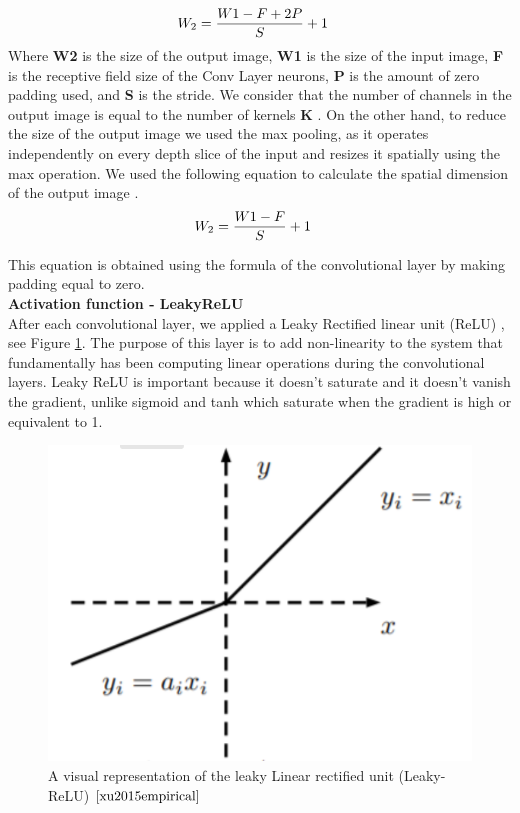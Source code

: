 \documentclass{vldb}
\begin{document}
\begin{align}
   & \large W_{2}=\frac{W1-F+2P}{S} +1 
\end{align}
Where \textbf{W2} is the size of the output image, \textbf{W1} is the size of the input image, \textbf{F} is the receptive field size of the Conv Layer neurons, \textbf{P} is the amount of zero padding used, and \textbf{S} is the stride. We consider that the number of channels in the output image is equal to the number of kernels \textbf{K} \cite{karpathy}.
On the other hand, to reduce the size of the output image we used the max pooling, as it operates independently on every depth slice of the input and resizes it spatially using the max operation. We used the following equation to calculate the spatial dimension of the output image \cite{schmidhuber2015deep}. 
\begin{align}
   & \large W_{2}=\frac{W1-F}{S} +1
\end{align}

This equation is obtained using the formula of the convolutional layer by making padding equal to zero.\\

\textbf{Activation function - LeakyReLU}\\

After each convolutional layer, we applied a Leaky Rectified linear unit (ReLU) \cite{xu2015empirical}, see Figure \ref{fig:leakyRelu}. The purpose of this layer is to add non-linearity to the system that fundamentally has been computing linear operations during the convolutional layers. Leaky ReLU is important because it doesn't saturate and it doesn't vanish the gradient, unlike sigmoid and tanh which saturate when the gradient is high or equivalent to 1. 
\begin{figure}[ht]
\centering
\includegraphics[width=0.9\columnwidth]{photo/leakyrelu}
\caption{A visual representation of the leaky Linear rectified unit (Leaky-ReLU) $\cite{xu2015empirical}$}
\label{fig:leakyRelu}
\end{figure}
\end{document}
